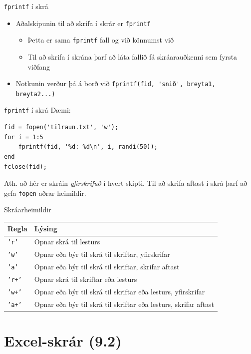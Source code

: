 \documentclass{beamer}
\begin{document}
\begin{frame}[fragile]{\texttt{fprintf} í skrá}
\begin{itemize}
 \item Aðalskipunin til að skrifa í skrár er \texttt{fprintf}
 \begin{itemize}
  \item Þetta er sama \texttt{fprintf} fall og við könnumst við
  \item Til að skrifa í skrána þarf að láta fallið fá skráarauðkenni sem fyrsta viðfang
 \end{itemize}
 \item Notkunin verður þá á borð við \verb|fprintf(fid, 'snið', breyta1, breyta2...)|
\end{itemize}
\end{frame}

\begin{frame}[fragile]{\texttt{fprintf} í skrá}
Dæmi:
\begin{verbatim}
fid = fopen('tilraun.txt', 'w');
for i = 1:5
    fprintf(fid, '%d: %d\n', i, randi(50));
end
fclose(fid);
\end{verbatim}
Ath. að hér er skráin \emph{yfirskrifuð} í hvert skipti. Til að skrifa aftast í skrá þarf að gefa \texttt{fopen} aðrar heimildir.
\end{frame}

\begin{frame}{Skráarheimildir}
\begin{center}
\begin{tabular}{ll}
\toprule
Regla&Lýsing\\
\midrule
\texttt{'r'}&Opnar skrá til lesturs\\
\texttt{'w'}&Opnar eða býr til skrá til skriftar, yfirskrifar\\
\texttt{'a'}&Opnar eða býr til skrá til skriftar, skrifar aftast\\
\texttt{'r+'}&Opnar skrá til skriftar eða lesturs\\
\texttt{'w+'}&Opnar eða býr til skrá til skriftar eða lesturs, yfirskrifar\\
\texttt{'a+'}&Opnar eða býr til skrá til skriftar eða lesturs, skrifar aftast\\
\bottomrule
\end{tabular}
\end{center}
\end{frame}

\section{Excel-skrár (9.2)}
\end{document}
